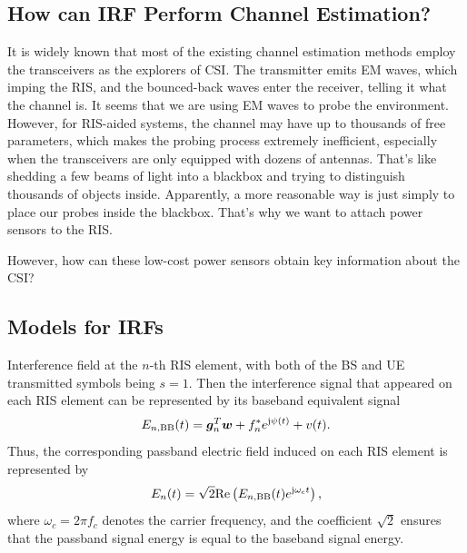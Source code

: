 \documentclass[12pt,draftclsnofoot,journal,onecolumn]{IEEEtran}
\theoremstyle{nonumberplain}
\begin{document}
\subsection{How can IRF Perform Channel Estimation?}
    It is widely known that most of the existing channel estimation methods employ the transceivers as the explorers of CSI. The transmitter emits EM waves, which imping the RIS, and the bounced-back waves enter the receiver, telling it what the channel is. It seems that we are using EM waves to probe the environment. However, for RIS-aided systems, the channel may have up to thousands of free parameters, which makes the probing process extremely inefficient, especially when the transceivers are only equipped with dozens of antennas. That's like shedding a few beams of light into a blackbox and trying to distinguish thousands of objects inside. Apparently, a more reasonable way is just simply to place our probes inside the blackbox. That's why we want to attach power sensors to the RIS. 

    However, how can these low-cost power sensors obtain key information about the CSI? 

\subsection{Models for IRFs}
    Interference field at the $n$-th RIS element, with both of the  \ac{BS} and \ac{UE} transmitted symbols being $s=1$. Then the interference signal that appeared on each RIS element can be represented by its baseband equivalent signal
    \begin{equation}
    \label{interference}
    E_{n,{\rm BB}}(t)=\bm g_{n}^{T}\bm w+f_{n}^{*}e^{{\rm j}\psi (t)}+v(t).
    \end{equation}
    Thus, the corresponding passband electric field induced on each RIS element is represented by 
    \begin{equation}
        E_{n}(t) = \sqrt{2} {\rm Re}\left( E_{n,{\rm BB}}(t)e^{{\rm j}\omega_c t} \right),
    \end{equation}
    where $\omega_c = 2\pi f_c$ denotes the carrier frequency, and the coefficient $\sqrt{2}$ ensures that the passband signal energy is equal to the baseband signal energy. 
\end{document}
